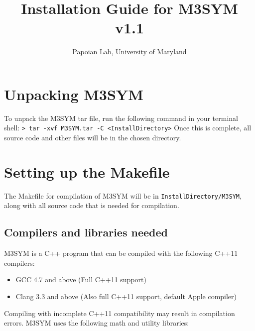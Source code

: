 \documentclass[11pt, oneside]{article}   	%
\title{Installation Guide for M3SYM v1.1}
\author{Papoian Lab, University of Maryland}
\date{}							%
\begin{document}
\maketitle

\tableofcontents
\newpage

\section{Unpacking M3SYM}
 
 To unpack the M3SYM tar file, run the following command in your terminal shell: \newline \newline \indent\texttt{> tar -xvf M3SYM.tar -C <InstallDirectory>} \newline \newline Once this is complete, all source code and other files will be in the chosen directory.
 
 
\section{Setting up the Makefile}

The Makefile for compilation of M3SYM will be in \texttt{InstallDirectory/M3SYM}, along with all source code that is needed for compilation.

\subsection {Compilers and libraries needed}

M3SYM is a C++ program that can be compiled with the following C++11 compilers:

\begin{itemize}
\item GCC 4.7 and above (Full C++11 support)
\item  Clang 3.3 and above (Also full C++11 support, default Apple compiler)
\end{itemize}  

\noindent Compiling with incomplete C++11 compatibility may result in compilation errors. \newline M3SYM uses the following math and utility libraries:
\end{document}
